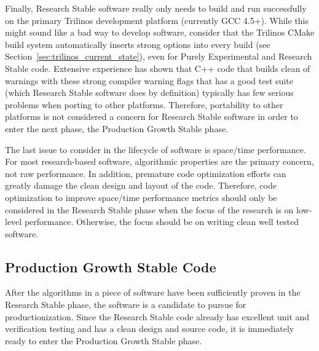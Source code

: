 \documentclass[11pt]{SANDreport}
\begin{document}
Finally, Research Stable software really only needs to build and run
successfully on the primary Trilinos development platform (currently
GCC 4.5+).  While this might sound like a bad way to develop software,
consider that the Trilinos CMake build system automatically inserts
strong options into every build (see
Section~\ref{sec:trilinos_current_state}), even for Purely
Experimental and Research Stable code.  Extensive experience has shown
that C++ code that builds clean of warnings with these strong compiler
warning flags that has a good test suite (which Research Stable
software does by definition) typically has few serious problems when
porting to other platforms.  Therefore, portability to other platforms
is not considered a concern for Research Stable software in order to
enter the next phase, the Production Growth Stable phase.

The last issue to consider in the lifecycle of software is space/time
performance.  For most research-based software, algorithmic properties
are the primary concern, not raw performance.  In addition, premature
code optimization efforts can greatly damage the clean design and
layout of the code.  Therefore, code optimization to improve
space/time performance metrics should only be considered in the
Research Stable phase when the focus of the research is on low-level
performance.  Otherwise, the focus should be on writing clean well
tested software.


%
{}\subsection{Production Growth Stable Code}
%

After the algorithms in a piece of software have been sufficiently
proven in the Research Stable phase, the software is a candidate to
pursue for productionization.  Since the Research Stable code
already has excellent unit and verification testing and has a clean
design and source code, it is immediately ready to enter the
Production Growth Stable phase.

\begin{floatingfigure}[r]{0.5\textwidth}
\begin{center}
\end{center}
\end{floatingfigure}
\end{document}
